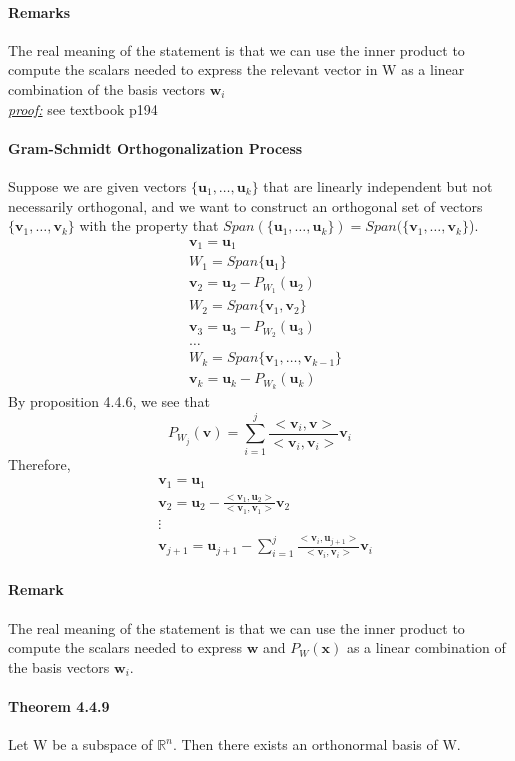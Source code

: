 \documentclass[11pt]{article}
\newcommand{\tb}[1]{\textbf{#1}}
\newcommand{\proof}[0]{\textit{\underline{proof:} }}
\newcommand{\real}[0]{\mathbb{R}}
\newcommand{\vx}[0]{\tb{x}}
\newcommand{\vu}[0]{\tb{u}}
\newcommand{\vw}[0]{\tb{w}}
\newcommand{\vv}[0]{\tb{v}}
\begin{document}
{\paragraph{Remarks}
The real meaning of the statement is that we can use the inner product to compute the scalars needed to express the relevant vector in W as a linear combination of the basis vectors $\vw_i$\\
\proof see textbook p194
\paragraph{Gram-Schmidt Orthogonalization Process}
Suppose we are given vectors $\{\vu_1,\hdots,\vu_k\}$ that are linearly independent but not necessarily orthogonal, and we want to construct an orthogonal set of vectors $\{\vv_1, \hdots, \vv_k\}$ with the property that $Span(\{\vu_1,\hdots,\vu_k\}) = Span(\{\vv_1,\hdots, \vv_k\}$).\\
\begin{align*}
&\vv_1 = \vu_1\\
&W_1 = Span\{\vu_1\}\\
&\vv_2 = \vu_2 - P_{W_1}(\vu_2)\\
&W_2 = Span\{\vv_1, \vv_2\}\\
&\vv_3 = \vu_3 - P_{W_2}(\vu_3)\\
&\hdots \\
&W_k = Span\{\vv_1, \hdots, \vv_{k-1}\}\\
&\vv_k = \vu_k - P_{W_k}(\vu_k)
\end{align*}
By proposition 4.4.6, we see that $$P_{W_j}(\vv) = \sum_{i=1}^j\frac{<\vv_i,\vv>}{<\vv_i, \vv_i>}\vv_i$$
Therefore,
\begin{align*}
&\vv_1 = \vu_1\\
&\vv_2 = \vu_2 - \frac{<\vv_1,\vu_2>}{<\vv_1, \vv_1>}\vv_2\\
&\vdots \\
&\vv_{j+1} = \vu_{j+1} - \sum_{i=1}^j\frac{<\vv_i,\vu_{j+1}>}{<\vv_i, \vv_i>}\vv_i
\end{align*}
\paragraph{Remark} The real meaning of the statement is that we can use the inner product to compute the scalars needed to express $\vw$ and $P_W(\vx)$ as a linear combination of the basis vectors $\vw_i$.
\paragraph{Theorem 4.4.9} Let W be a subspace of $\real^n$. Then there exists an orthonormal basis of W.
}
\end{document}
